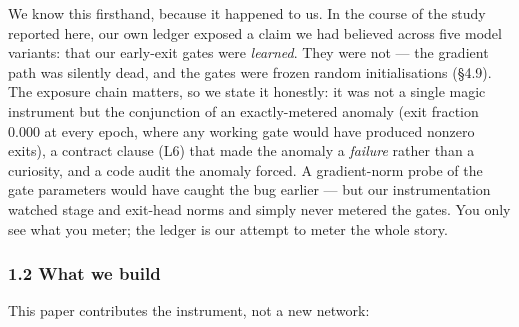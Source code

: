 \documentclass[
]{article}
\begin{document}
We know this firsthand, because it happened to us. In the course of the
study reported here, our own ledger exposed a claim we had believed
across five model variants: that our early-exit gates were
\emph{learned}. They were not --- the gradient path was silently dead,
and the gates were frozen random initialisations (§4.9). The exposure
chain matters, so we state it honestly: it was not a single magic
instrument but the conjunction of an exactly-metered anomaly (exit
fraction 0.000 at every epoch, where any working gate would have
produced nonzero exits), a contract clause (L6) that made the anomaly a
\emph{failure} rather than a curiosity, and a code audit the anomaly
forced. A gradient-norm probe of the gate parameters would have caught
the bug earlier --- but our instrumentation watched stage and exit-head
norms and simply never metered the gates. You only see what you meter;
the ledger is our attempt to meter the whole story.

\hypertarget{what-we-build}{%
\subsubsection{1.2 What we build}\label{what-we-build}}

This paper contributes the instrument, not a new network:
\end{document}
